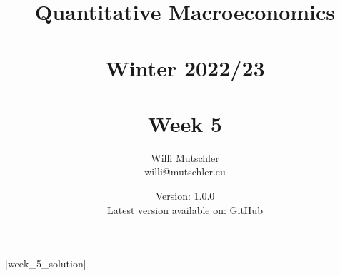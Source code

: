 
\newif\ifDisplaySolutions%


\title{Quantitative Macroeconomics\\~\\Winter 2022/23\\~\\Week 5}
\author{Willi Mutschler\\willi@mutschler.eu}
\date{Version: 1.0.0\\Latest version available on: \href{https://github.com/wmutschl/Quantitative-Macroeconomics/releases/latest/download/week_5.pdf}{GitHub}}
\maketitle\thispagestyle{empty}

\newpage
{}[week_5_solution]
\tableofcontents\thispagestyle{empty}\newpage

\setcounter{page}{1}
\newpage
\newpage
\newpage
\printbibliography
\newpage

\ifDisplaySolutions
\newpage
\appendix
\section{Solutions}

\fi

